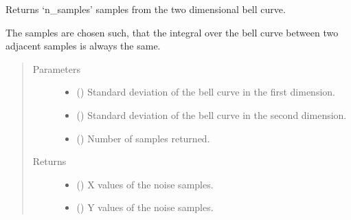 \documentclass[letterpaper,10pt,english]{sphinxmanual}
\begin{document}

\begin{fulllineitems}
\label{\detokenize{qsim:qsim.noise.sample_2dim_gaussian_distribution}}
Returns ‘n\_samples’ samples from the two dimensional bell curve.

The samples are chosen such, that the integral over the bell curve between
two adjacent samples is always the same.
\begin{quote}\begin{description}
\item[{Parameters}] \leavevmode\begin{itemize}
\item {} 
 () \textendash{} Standard deviation of the bell curve in the first dimension.

\item {} 
 () \textendash{} Standard deviation of the bell curve in the second dimension.

\item {} 
 () \textendash{} Number of samples returned.

\end{itemize}

\item[{Returns}] \leavevmode
\begin{itemize}
\item {} 
 () \textendash{} X values of the noise samples.

\item {} 
 () \textendash{} Y values of the noise samples.

\end{itemize}


\end{description}\end{quote}

\end{fulllineitems}
\end{document}
